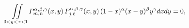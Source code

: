 \[\iint\limits_{0<y<x<1}\mathop{P^{\alpha,\beta,\gamma}_{m,n}\/}\nolimits\!\left%
(x,y\right)\mathop{P^{\alpha,\beta,\gamma}_{j,\ell}\/}\nolimits\!\left(x,y%
\right)\*(1-x)^{\alpha}(x-y)^{\beta}y^{\gamma}dxdy=0,\]